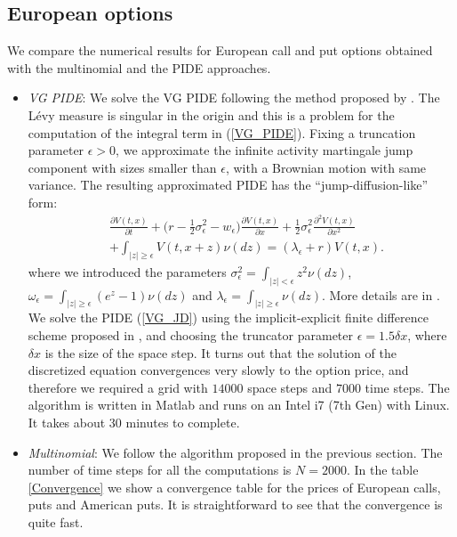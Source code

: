 \documentclass[]{interact}
\theoremstyle{plain}%
\theoremstyle{definition}
\theoremstyle{remark}
\begin{document}
\subsection{European options}


We compare the numerical results for European call and put options obtained with the multinomial and the PIDE approaches.
\begin{itemize}
 \item \emph{VG PIDE}: We solve the VG PIDE following the method proposed by \cite{CoVo05b}. The L\'{e}vy measure is singular in the origin
 and this is a problem for the computation of the integral term in (\ref{VG_PIDE}). 
 Fixing a truncation parameter $\epsilon >0$, we approximate the infinite activity martingale jump component with sizes smaller than $\epsilon$, with a Brownian motion with same variance.
 The resulting approximated PIDE has the ``jump-diffusion-like'' form:
 \begin{align}\label{VG_JD}
&  \frac{\partial V(t,x)}{\partial t} +
 \bigl( r-\frac{1}{2}\sigma_{\epsilon}^2 - w_{\epsilon} \bigr) \frac{\partial V(t,x)}{\partial x} 
 + \frac{1}{2}\sigma_{\epsilon}^2 \frac{\partial^2 V(t,x)}{\partial x^2} \\ \nonumber
 &+ \int_{|z| \geq \epsilon} V(t,x+z) \nu(dz) = (\lambda_{\epsilon} + r) V(t,x).
\end{align}
 where we introduced the parameters $\sigma_{\epsilon}^2 = \int_{|z| < \epsilon} z^2 \nu(dz)$, $\omega_{\epsilon} = \int_{|z| \geq \epsilon} (e^z-1) \nu(dz)$ and
 $\lambda_{\epsilon} = \int_{|z| \geq \epsilon} \nu(dz)$. More details are in \cite{Cont}.
 We solve the PIDE (\ref{VG_JD}) using the implicit-explicit finite difference scheme proposed in \cite{CoVo05b}, and choosing the truncator parameter $\epsilon = 1.5 \delta x$, 
 where $\delta x$ is the size of 
 the space step. It turns out that the solution of the discretized equation convergences very slowly to the option price, and therefore we required a grid with $14000$ space steps 
 and $7000$ time steps. The algorithm is written in Matlab and runs
 on an Intel i7 (7th Gen) with Linux. It takes about 30 minutes to complete. 
 \item \emph{Multinomial}: We follow the algorithm proposed in the previous section. The number of time steps for all the computations is $N=2000$. In the table \ref{Convergence} 
 we show a convergence table for the prices of European calls, puts and American puts. It is straightforward to see that the convergence is quite fast.  
\end{itemize}
\end{document}
